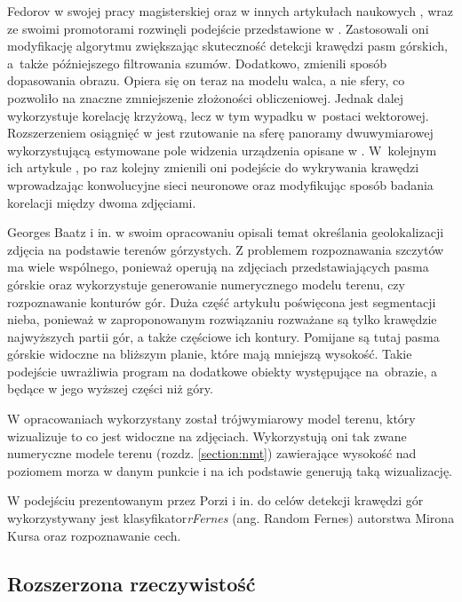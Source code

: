 Fedorov w swojej pracy magisterskiej \cite{peak-social-media} oraz w innych artykułach naukowych \cite{peak-in-visual-content,outdoor_peak},  wraz ze swoimi promotorami rozwinęli podejście przedstawione w \cite{auto-terrain}. Zastosowali oni modyfikację algorytmu zwiększając skuteczność detekcji krawędzi pasm górskich, a~także późniejszego filtrowania szumów. Dodatkowo, zmienili sposób dopasowania obrazu. Opiera się on teraz na modelu walca, a nie sfery, co pozwoliło na znaczne zmniejszenie złożoności obliczeniowej. Jednak dalej wykorzystuje korelację krzyżową, lecz w tym wypadku w~postaci wektorowej. Rozszerzeniem osiągnięć w \cite{peak-social-media} jest rzutowanie na sferę panoramy dwuwymiarowej wykorzystującą estymowane pole widzenia urządzenia opisane w \cite{peak-in-visual-content}. W~kolejnym ich artykule \cite{outdoor_peak}, po raz kolejny zmienili oni podejście do wykrywania krawędzi wprowadzając konwolucyjne sieci neuronowe oraz modyfikując sposób badania korelacji między dwoma zdjęciami. 

\par

Georges Baatz i in. w swoim opracowaniu \cite{large-scale-visual} opisali temat określania geolokalizacji zdjęcia na podstawie terenów górzystych. Z problemem rozpoznawania szczytów ma wiele wspólnego, ponieważ operują na zdjęciach przedstawiających pasma górskie oraz wykorzystuje generowanie numerycznego modelu terenu, czy rozpoznawanie konturów gór. Duża część artykułu poświęcona jest segmentacji nieba, ponieważ w zaproponowanym rozwiązaniu rozważane są tylko krawędzie najwyższych partii gór, a także częściowe ich kontury. Pomijane są tutaj pasma górskie widoczne na bliższym planie, które mają mniejszą wysokość. Takie podejście uwrażliwia program na dodatkowe obiekty występujące na~obrazie, a będące w jego wyższej części niż góry. 

W opracowaniach \cite{auto-terrain,peak-in-visual-content,peak-social-media} wykorzystany został trójwymiarowy model terenu, który wizualizuje to co jest widoczne na zdjęciach. Wykorzystują oni tak zwane numeryczne modele terenu (rozdz. \ref{section:nmt}) zawierające wysokość nad poziomem morza w danym punkcie i na ich podstawie generują taką wizualizację.

W podejściu prezentowanym przez Porzi i in. \cite{porzi} do celów detekcji krawędzi gór wykorzystywany jest klasyfikator\textit{rFernes} (ang. Random Fernes) autorstwa Mirona Kursa \cite{rFernes} oraz rozpoznawanie cech. 

\subsection{Rozszerzona rzeczywistość}
    
